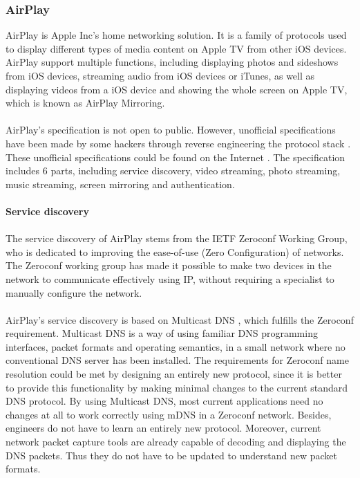 \subsubsection{AirPlay} 
AirPlay is Apple Inc's home networking solution. It is a family of protocols 
used to display different types of media content on Apple TV from other iOS devices. 
AirPlay support multiple functions, including displaying photos and sideshows from iOS devices, streaming audio from iOS devices or iTunes, as well as displaying videos from a iOS device and 
showing the whole screen on Apple TV, which is known as AirPlay Mirroring. \\
\\
AirPlay's specification is not open to public. However, unofficial specifications have been made by some hackers through reverse engineering the protocol stack \cite{AirPlay-spec}. These unofficial specifications could be found on the Internet \cite{AirPlay-spec}.  
The specification includes 6 parts, including service discovery, video
streaming, photo streaming, music streaming, screen mirroring and
authentication.\\
\\
\textbf{Service discovery} \\
\\ 
The service discovery of AirPlay stems from the IETF Zeroconf Working Group, 
who is dedicated to improving the ease-of-use (Zero Configuration) of networks. The 
Zeroconf working group has made it possible to make two devices in the 
network to communicate effectively using IP, without requiring a specialist to manually 
configure the network. \\
\\
AirPlay's service discovery is based on Multicast DNS \cite{multicastdns}, which 
fulfills the Zeroconf requirement. Multicast DNS is a way of using familiar DNS 
programming interfaces, packet formats and operating semantics, in a small 
network where no conventional DNS server has been installed. The requirements 
for Zeroconf name resolution could be met by designing an entirely new 
protocol, since it is better to provide this functionality by making minimal changes 
to the current standard DNS protocol. By using Multicast DNS, most current 
applications need no changes at all to work correctly using mDNS in a Zeroconf network. Besides,
engineers do not have to learn an entirely new protocol. Moreover, current network 
packet capture tools are already capable of  decoding and displaying the DNS packets. Thus they do not 
have to be updated to understand new packet formats. \\
